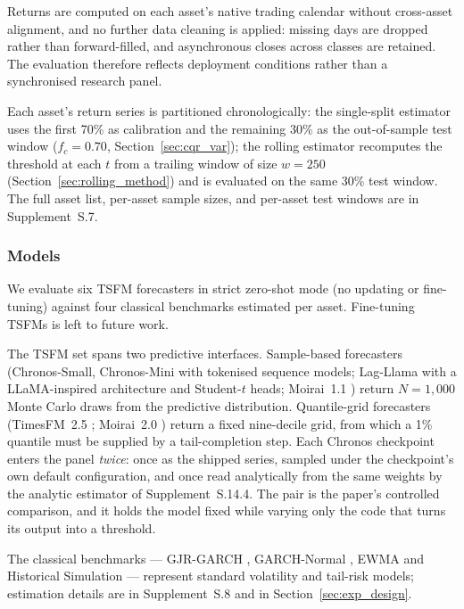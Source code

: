 \documentclass[preprint,11pt,authoryear]{elsarticle}
\newcommand{\1}{\boldsymbol{1}}
\begin{document}
Returns are computed on each asset's native trading calendar without cross-asset alignment, and no further data cleaning is applied: missing days are dropped rather than forward-filled, and asynchronous closes across classes are retained. The evaluation therefore reflects deployment conditions rather than a synchronised research panel.

Each asset's return series is partitioned chronologically: the single-split estimator uses the first 70\% as calibration and the remaining 30\% as the out-of-sample test window ($f_c = 0.70$, Section~\ref{sec:cqr_var}); the rolling estimator recomputes the threshold at each $t$ from a trailing window of size $w = 250$ (Section~\ref{sec:rolling_method}) and is evaluated on the same 30\% test window. The full asset list, per-asset sample sizes, and per-asset test windows are in Supplement~S.7.

\subsubsection{Models}
\label{sec:models}

We evaluate six TSFM forecasters in strict zero-shot mode (no updating or fine-tuning) against four classical benchmarks estimated per asset. Fine-tuning TSFMs is left to future work.

The TSFM set spans two predictive interfaces. Sample-based forecasters (Chronos-Small, Chronos-Mini \citep{ansari2024chronos,ansari2025chronos2} with tokenised sequence models; Lag-Llama \citep{rasul2024lagllama} with a LLaMA-inspired architecture and Student-$t$ heads; Moirai~1.1 \citep{woo2024moirai}) return $N = 1{,}000$ Monte Carlo draws from the predictive distribution. Quantile-grid forecasters (TimesFM~2.5 \citep{das2024timesfm}; Moirai~2.0 \citep{liu2025moirai}) return a fixed nine-decile grid, from which a 1\% quantile must be supplied by a tail-completion step. Each Chronos checkpoint enters the panel \emph{twice}: once as the shipped series, sampled under the checkpoint's own default configuration, and once read analytically from the same weights by the analytic estimator of Supplement~S.14.4. The pair is the paper's controlled comparison, and it holds the model fixed while varying only the code that turns its output into a threshold.

The classical benchmarks --- GJR-GARCH \citep{glosten1993relation}, GARCH-Normal \citep{bollerslev1986generalized}, EWMA \citep{riskmetrics1996} and Historical Simulation --- represent standard volatility and tail-risk models; estimation details are in Supplement~S.8 and in Section~\ref{sec:exp_design}.
\end{document}
